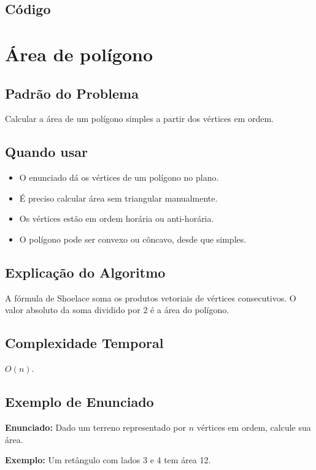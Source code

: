 \subsection{Código}

\section{Área de polígono}

\subsection{Padrão do Problema}
Calcular a área de um polígono simples a partir dos vértices em ordem.

\subsection{Quando usar}
\begin{itemize}[nosep]
  \item O enunciado dá os vértices de um polígono no plano.
  \item É preciso calcular área sem triangular manualmente.
  \item Os vértices estão em ordem horária ou anti-horária.
  \item O polígono pode ser convexo ou côncavo, desde que simples.
\end{itemize}

\subsection{Explicação do Algoritmo}
A fórmula de Shoelace soma os produtos vetoriais de vértices consecutivos. O valor absoluto da soma dividido por 2 é a área do polígono.

\subsection{Complexidade Temporal}
$O(n)$.

\subsection{Exemplo de Enunciado}
\begin{exemplodiabox}
\textbf{Enunciado:} Dado um terreno representado por $n$ vértices em ordem, calcule sua área.

\textbf{Exemplo:} Um retângulo com lados 3 e 4 tem área 12.
\end{exemplodiabox}

